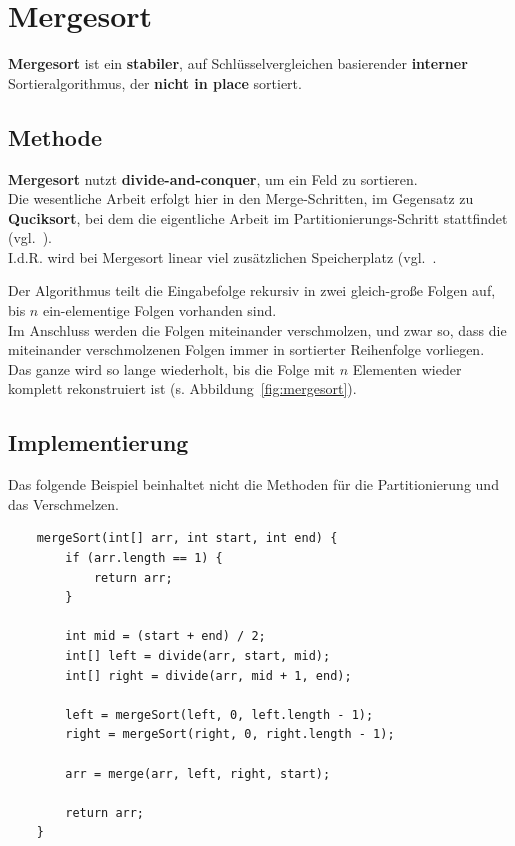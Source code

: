\section{Mergesort}

\textbf{Mergesort} ist ein \textbf{stabiler}, auf Schlüsselvergleichen basierender \textbf{interner} Sortieralgorithmus, der \textbf{nicht in place} sortiert.

\subsection{Methode}

\textbf{Mergesort} nutzt \textbf{divide-and-conquer}, um ein Feld zu sortieren.\\
Die wesentliche Arbeit erfolgt hier in den Merge-Schritten, im Gegensatz zu \textbf{Quciksort}, bei dem die eigentliche Arbeit im Partitionierungs-Schritt stattfindet (vgl.~\cite[174]{GD18e}).\\
I.d.R. wird bei Mergesort linear viel zusätzlichen Speicherplatz (vgl.~\cite[112]{OW17b}.

\noindent
Der Algorithmus teilt die Eingabefolge rekursiv in zwei gleich-große Folgen auf, bis $n$ ein-elementige Folgen vorhanden sind.\\
Im Anschluss werden die Folgen miteinander verschmolzen, und zwar so, dass die miteinander verschmolzenen Folgen immer in sortierter Reihenfolge vorliegen.\\
Das ganze wird so lange wiederholt, bis die Folge mit $n$ Elementen wieder komplett rekonstruiert ist (s. Abbildung~\ref{fig:mergesort}).

\subsection{Implementierung}

Das folgende Beispiel beinhaltet nicht die Methoden für die Partitionierung und das Verschmelzen.

\begin{verbatim}
    mergeSort(int[] arr, int start, int end) {
        if (arr.length == 1) {
            return arr;
        }

        int mid = (start + end) / 2;
        int[] left = divide(arr, start, mid);
        int[] right = divide(arr, mid + 1, end);

        left = mergeSort(left, 0, left.length - 1);
        right = mergeSort(right, 0, right.length - 1);

        arr = merge(arr, left, right, start);

        return arr;
    }

\end{verbatim}

